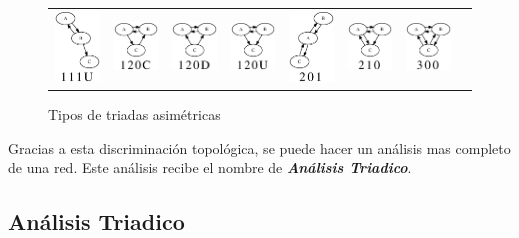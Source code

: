 \begin{figure}[!htb]
\begin{center}
\begin{tabular}{m{1.3cm}|m{1.3cm}|m{1.3cm}|m{1.3cm}|m{1.3cm}|m{1.3cm}|m{1.3cm}|m{1.3cm}}
        \includegraphics[width=1.3cm]{./imagenes/triada_111U.eps} & 
        \includegraphics[width=1.3cm]{./imagenes/triada_120C.eps} & 
        \includegraphics[width=1.3cm]{./imagenes/triada_120D.eps} & 
        \includegraphics[width=1.3cm]{./imagenes/triada_120U.eps} & 
        \includegraphics[width=1.3cm]{./imagenes/triada_201.eps} & 
        \includegraphics[width=1.3cm]{./imagenes/triada_210.eps} & 
        \includegraphics[width=1.3cm]{./imagenes/triada_300.eps}\\
      \end{tabular}
    \caption{Tipos de triadas asimétricas}
    \label{fig:tipos_triadas_asimetricas}
  \end{center}
\end{figure}

Gracias a esta discriminación topológica, se puede hacer un análisis mas completo de una red. Este análisis recibe el nombre de \textbf{\textit{Análisis Triadico}}.

\subsection{Análisis Triadico}

